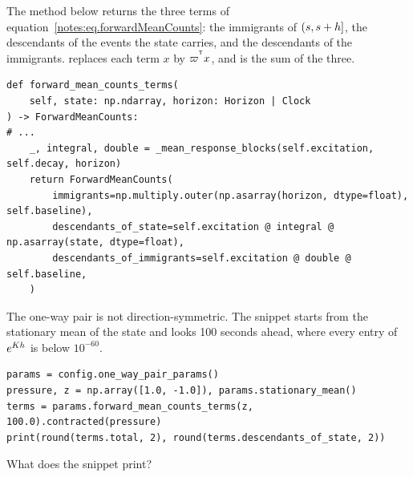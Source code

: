 \begin{question}
\label{question.signedCountDriftOnTheOneWayPair}
The method below returns the three terms of equation~\eqref{notes:eq.forwardMeanCounts}:
the immigrants of $(s, s + h]$,
the descendants of the events the state carries,
and the descendants of the immigrants.
 replaces each term $x$ by $\varpi^{^{\mathsf{T}}} x$,
and  is the sum of the three.
\begin{lstlisting}[caption={\protect\codehl{unito26.lob.hawkes.HawkesParams.forward\_mean\_counts\_terms}, its docstring elided.}, label=listing.forwardMeanCountsTerms]
def forward_mean_counts_terms(
    self, state: np.ndarray, horizon: Horizon | Clock
) -> ForwardMeanCounts:
# ...
    _, integral, double = _mean_response_blocks(self.excitation, self.decay, horizon)
    return ForwardMeanCounts(
        immigrants=np.multiply.outer(np.asarray(horizon, dtype=float), self.baseline),
        descendants_of_state=self.excitation @ integral @ np.asarray(state, dtype=float),
        descendants_of_immigrants=self.excitation @ double @ self.baseline,
    )
\end{lstlisting}
The one-way pair is not direction-symmetric.
The snippet starts from the stationary mean of the state
and looks 100 seconds ahead,
where every entry of $e^{K h}$ is below $10^{-60}$.
\begin{lstlisting}[caption={Buys minus sells over 100 seconds}, label=listing.signedCountDriftOnTheOneWayPair]
params = config.one_way_pair_params()
pressure, z = np.array([1.0, -1.0]), params.stationary_mean()
terms = params.forward_mean_counts_terms(z, 100.0).contracted(pressure)
print(round(terms.total, 2), round(terms.descendants_of_state, 2))
\end{lstlisting}
What does the snippet print?
\begin{choices}
 \choice {}
 \choice {}
 \choice {}
 \choice {}
 \correctchoice {}
\end{choices}
\end{question}

